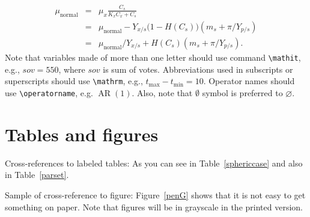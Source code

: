 \documentclass[qe,nameyear,draft]{econsocart}
\theoremstyle{plain}
\begin{document}
\begin{eqnarray}
 \mu_{\text{normal}} & = & \mu_{x} \frac{C_{s}}{K_{x}C_{x}+C_{s}}  \nonumber\\
                     & = & \mu_{\text{normal}} - Y_{x/s}\bigl(1-H(C_{s})\bigr)(m_{s}+\pi /Y_{p/s})\nonumber\\
                     & = & \mu_{\text{normal}}/Y_{x/s}+ H(C_{s}) (m_{s}+ \pi /Y_{p/s}).\label{e7}
\end{eqnarray}
Note that variables made of more than one letter should use command \texttt{{\textbackslash}mathit},
e.g., $\mathit{sov}=550$, where $\mathit{sov}$ is sum of votes. Abbreviations used in subscripts or superscripts should use \texttt{{\textbackslash}mathrm},
e.g., $t_{\mathrm{max}} -t_{\mathrm{min}} =10$. Operator names should use \texttt{{\textbackslash}operatorname}, e.g. $\operatorname{AR}(1)$. Also, note that $\emptyset$ symbol is preferred to $\varnothing$.

\section{Tables and figures}

Cross-references to labeled tables: As you can see in Table~\ref{sphericcase}
and also in Table~\ref{parset}.

Sample of cross-reference to figure: Figure~\ref{penG} shows that it is not easy to get something on paper. Note that figures will be in grayscale in the printed version.
\end{document}
